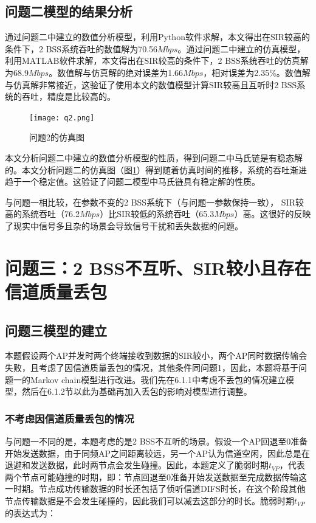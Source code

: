 \documentclass[bwprint]{gmcmthesis}
\begin{document}
\subsection{问题二模型的结果分析}

通过问题二中建立的数值分析模型，利用Python软件求解，本文得出在SIR较高的条件下，2 BSS系统吞吐的数值解为70.56$Mbps$。通过问题二中建立的仿真模型，利用MATLAB软件求解，本文得出在SIR较高的条件下，2 BSS系统吞吐的仿真解为68.9$Mbps$。数值解与仿真解的绝对误差为1.66$Mbps$，相对误差为2.35\%。数值解与仿真解非常接近，这验证了使用本文的数值模型计算SIR较高且互听时2 BSS系统的吞吐，精度是比较高的。

\begin{figure}[H]
    \centering
    \texttt{[image: q2.png]}
    \caption{问题2的仿真图}
    \label{fig:q2}
\end{figure}

本文分析问题二中建立的数值分析模型的性质，得到问题二中马氏链是有稳态解的。本文分析问题二的仿真图（图\ref{fig:q2}）得到随着仿真时间的推移，系统的吞吐渐进趋于一个稳定值。这验证了问题二模型中马氏链具有稳定解的性质。

与问题一相比较，在参数不变的2 BSS系统下（与问题一参数保持一致）， SIR较高的系统吞吐（76.2$Mbps$）比SIR较低的系统吞吐（65.3$Mbps$）高。这很好的反映了现实中信号多且杂的场景会导致信号干扰和丢失数据的问题。

\section{问题三：2 BSS不互听、SIR较小且存在信道质量丢包}

\subsection{问题三模型的建立}

本题假设两个AP并发时两个终端接收到数据的SIR较小，两个AP同时数据传输会失败，且考虑了因信道质量丢包的情况，其他条件同问题1，因此，本题将基于问题一的Markov chain模型进行改进。我们先在6.1.1中考虑不丢包的情况建立模型，然后在6.1.2节以此为基础再加入丢包的影响对模型进行调整。

\subsubsection{不考虑因信道质量丢包的情况}

与问题一不同的是，本题考虑的是2 BSS不互听的场景。假设一个AP回退至0准备开始发送数据，由于同频AP之间距离较远，另一个AP认为信道空闲，因此总是在退避和发送数据，此时两节点会发生碰撞\cite{cite3}。因此，本题定义了脆弱时期$t_{VP}$，代表两个节点可能碰撞的时期，即：节点回退至0准备开始发送数据至完成数据传输这一时期。节点成功传输数据的时长还包括了侦听信道DIFS时长，在这个阶段其他节点传输数据是不会发生碰撞的，因此我们可以减去这部分的时长。脆弱时期$t_{VP}$的表达式为：
\end{document}
